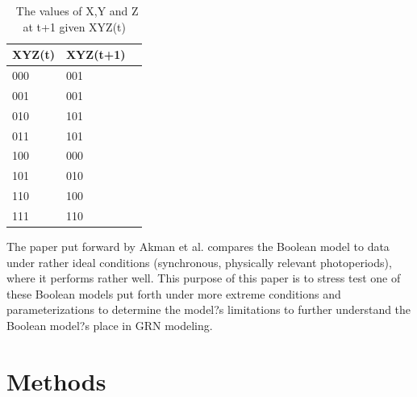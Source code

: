 \documentclass[twoside,twocolumn,9pt]{article}
\begin{document}
\begin{table}[h]
\small
  \caption{\ The values of X,Y and Z at t+1 given XYZ(t)}
  \label{tbl:example}
  \begin{tabular*}{0.5\textwidth}{@{\extracolsep{\fill}}lll}
    \hline
    XYZ(t) & XYZ(t+1) \\
    \hline
    000 & 001 \\
    001 & 001 \\
    010 & 101 \\
    011 & 101 \\
    100 & 000 \\
    101 & 010 \\
    110 & 100 \\
    111 & 110 \\
    \hline
  \end{tabular*}
\end{table}

The paper put forward by Akman et al. compares the Boolean model to data under rather ideal conditions (synchronous, physically relevant photoperiods),  where it performs rather well. This purpose of this paper is to stress test one of these Boolean models put forth under more extreme conditions and parameterizations to determine the model?s limitations to further understand the Boolean model?s place in GRN modeling.


\section{Methods}
\end{document}

